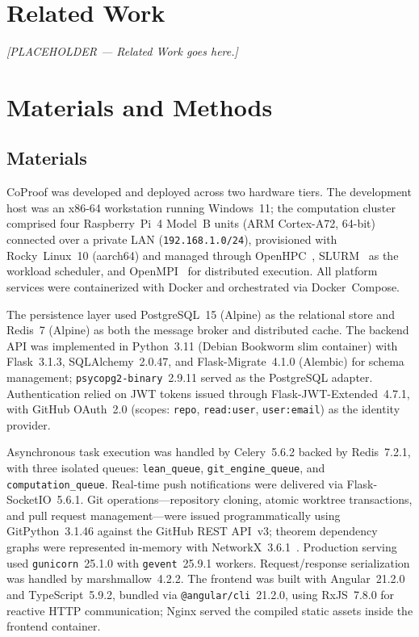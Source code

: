 \documentclass[conference]{IEEEtran}
\begin{document}
\section{Related Work}
\label{sec:related}
\textit{[PLACEHOLDER --- Related Work goes here.]}

\section{Materials and Methods}
\label{sec:materials-methods}

\subsection{Materials}
\label{subsec:materials}

CoProof was developed and deployed across two hardware tiers. The
development host was an x86-64 workstation running Windows~11; the
computation cluster comprised four Raspberry~Pi~4 Model~B units
(ARM Cortex-A72, 64-bit) connected over a private LAN
(\texttt{192.168.1.0/24}), provisioned with Rocky~Linux~10 (aarch64) and
managed through OpenHPC~\cite{ref:openhpc}, SLURM~\cite{ref:slurm} as
the workload scheduler, and OpenMPI~\cite{ref:openmpi} for distributed
execution. All platform services were containerized with Docker and
orchestrated via Docker~Compose.

The persistence layer used PostgreSQL~15 (Alpine) as the relational store
and Redis~7 (Alpine) as both the message broker and distributed cache.
The backend API was implemented in Python~3.11 (Debian Bookworm slim
container) with Flask~3.1.3, SQLAlchemy~2.0.47, and Flask-Migrate~4.1.0
(Alembic) for schema management; \texttt{psycopg2-binary}~2.9.11 served
as the PostgreSQL adapter. Authentication relied on JWT tokens issued
through Flask-JWT-Extended~4.7.1, with GitHub OAuth~2.0 (scopes:
\texttt{repo}, \texttt{read:user}, \texttt{user:email}) as the identity
provider.

Asynchronous task execution was handled by Celery~5.6.2 backed by
Redis~7.2.1, with three isolated queues: \texttt{lean\_queue},
\texttt{git\_engine\_queue}, and \texttt{computation\_queue}. Real-time
push notifications were delivered via Flask-SocketIO~5.6.1. Git
operations---repository cloning, atomic worktree transactions, and pull
request management---were issued programmatically using
GitPython~3.1.46 against the GitHub REST API~v3; theorem dependency
graphs were represented in-memory with NetworkX~3.6.1~\cite{ref:networkx}.
Production serving used \texttt{gunicorn}~25.1.0 with
\texttt{gevent}~25.9.1 workers. Request/response serialization was
handled by marshmallow~4.2.2. The frontend was built with
Angular~21.2.0 and TypeScript~5.9.2, bundled via
\texttt{@angular/cli}~21.2.0, using RxJS~7.8.0 for reactive HTTP
communication; Nginx served the compiled static assets inside the
frontend container.
\end{document}
